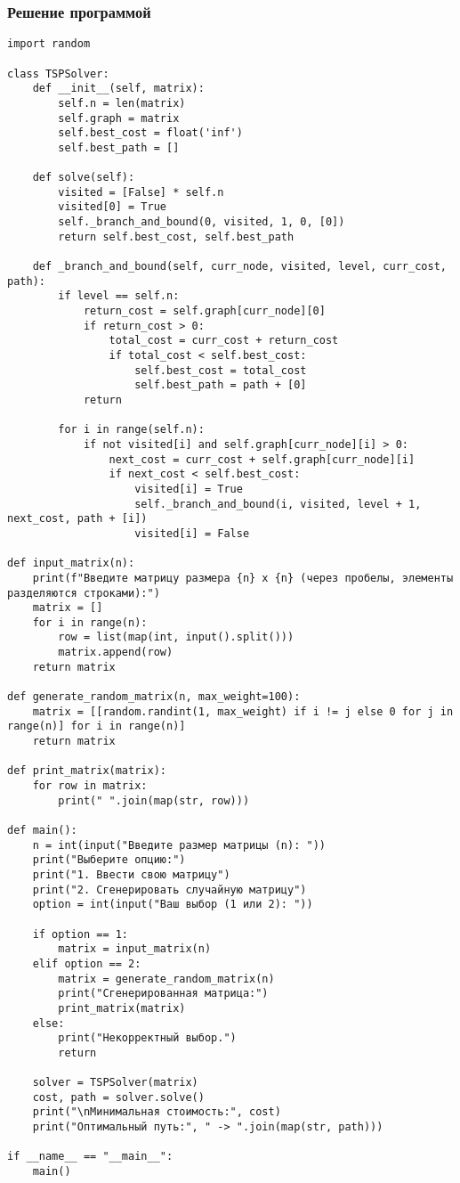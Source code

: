 \documentclass[17pt]{extarticle}
\begin{document}
\subsubsection{Решение программой}
\begin{verbatim}
import random  
  
class TSPSolver:  
    def __init__(self, matrix):  
        self.n = len(matrix)  
        self.graph = matrix  
        self.best_cost = float('inf')  
        self.best_path = []  
  
    def solve(self):  
        visited = [False] * self.n  
        visited[0] = True  
        self._branch_and_bound(0, visited, 1, 0, [0])  
        return self.best_cost, self.best_path  
  
    def _branch_and_bound(self, curr_node, visited, level, curr_cost, path):  
        if level == self.n:  
            return_cost = self.graph[curr_node][0]  
            if return_cost > 0:  
                total_cost = curr_cost + return_cost  
                if total_cost < self.best_cost:  
                    self.best_cost = total_cost  
                    self.best_path = path + [0]  
            return  
  
        for i in range(self.n):  
            if not visited[i] and self.graph[curr_node][i] > 0:  
                next_cost = curr_cost + self.graph[curr_node][i]  
                if next_cost < self.best_cost:  
                    visited[i] = True  
                    self._branch_and_bound(i, visited, level + 1, next_cost, path + [i])  
                    visited[i] = False  
  
def input_matrix(n):  
    print(f"Введите матрицу размера {n} x {n} (через пробелы, элементы разделяются строками):")  
    matrix = []  
    for i in range(n):  
        row = list(map(int, input().split()))  
        matrix.append(row)  
    return matrix  
  
def generate_random_matrix(n, max_weight=100):  
    matrix = [[random.randint(1, max_weight) if i != j else 0 for j in range(n)] for i in range(n)]  
    return matrix  
  
def print_matrix(matrix):  
    for row in matrix:  
        print(" ".join(map(str, row)))  
  
def main():  
    n = int(input("Введите размер матрицы (n): "))  
    print("Выберите опцию:")  
    print("1. Ввести свою матрицу")  
    print("2. Сгенерировать случайную матрицу")  
    option = int(input("Ваш выбор (1 или 2): "))  
  
    if option == 1:  
        matrix = input_matrix(n)  
    elif option == 2:  
        matrix = generate_random_matrix(n)  
        print("Сгенерированная матрица:")  
        print_matrix(matrix)  
    else:  
        print("Некорректный выбор.")  
        return  
  
    solver = TSPSolver(matrix)  
    cost, path = solver.solve()  
    print("\nМинимальная стоимость:", cost)  
    print("Оптимальный путь:", " -> ".join(map(str, path)))  
  
if __name__ == "__main__":  
    main()
\end{verbatim}
\end{document}
